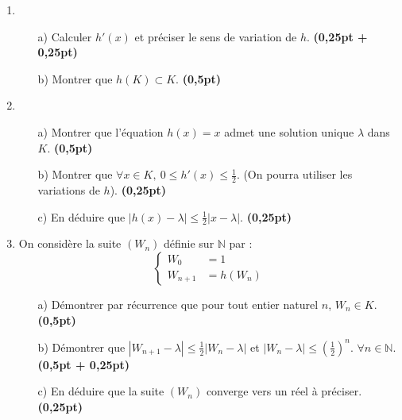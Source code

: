 \documentclass[12pt]{article}
\begin{document}
\begin{enumerate}
    \item 
    \begin{enumerate}
        \item[a)] Calculer \( h'(x) \) et préciser le sens de variation de \( h \). \hfill \textbf{(0,25pt + 0,25pt)}
        
        \item[b)] Montrer que \( h(K) \subset K \). \hfill \textbf{(0,5pt)}
    \end{enumerate}

    \item 
    \begin{enumerate}
        \item[a)] Montrer que l'équation \( h(x) = x \) admet une solution unique \( \lambda \) dans \( K \). \hfill \textbf{(0,5pt)}
        
        \item[b)] Montrer que \( \forall x \in K, \ 0 \leq h'(x) \leq \frac{1}{2} \). (On pourra utiliser les variations de \( h \)). \hfill \textbf{(0,25pt)}
        
        \item[c)] En déduire que \( |h(x) - \lambda| \leq \frac{1}{2} |x - \lambda| \). \hfill \textbf{(0,25pt)}
    \end{enumerate}
    
    \item On considère la suite \( (W_n) \) définie sur \( \mathbb{N} \) par :
    \[
    \left\{
    \begin{aligned}
        W_0 &= 1 \\
        W_{n+1} &= h(W_n)
    \end{aligned}
    \right.
    \]
    \begin{enumerate}
        \item[a)] Démontrer par récurrence que pour tout entier naturel \( n \), \( W_n \in K \). \hfill \textbf{(0,5pt)}
        
        \item[b)] Démontrer que \( |W_{n+1} - \lambda| \leq \frac{1}{2} |W_n - \lambda| \) et \( |W_n - \lambda| \leq \left( \frac{1}{2} \right)^n \). \( \forall n \in \mathbb{N} \). \hfill \textbf{(0,5pt + 0,25pt)}
        
        \item[c)] En déduire que la suite \( (W_n) \) converge vers un réel à préciser. \hfill \textbf{(0,25pt)}
    \end{enumerate}
\end{enumerate}
\end{document}
